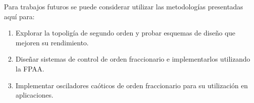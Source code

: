	Para trabajos futuros se puede considerar utilizar las metodologías presentadas aquí para:
	
	\begin{enumerate}
		\item Explorar la topoligía de segundo orden y probar esquemas de diseño que mejoren su rendimiento.
		\item Diseñar sistemas de control de orden fraccionario e implementarlos utilizando la FPAA. 
		\item Implementar osciladores caóticos de orden fraccionario para su utilización en aplicaciones.
	\end{enumerate}	 